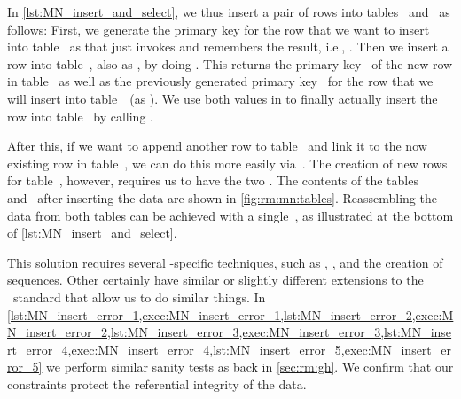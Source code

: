 %
\begin{sloppypar}%
In \cref{lst:MN_insert_and_select}, we thus insert a pair of rows into tables~ and~ as follows:
First, we generate the primary key for the row that we want to insert into table~ as  that just invokes  and remembers the result, i.e., .
Then we insert a row into table~, also as , by doing .
This  returns the primary key~ of the new row in table~ as well as the previously generated primary key~ for the row that we will insert into table~~(as ).
We use both values in to finally actually insert the row into table~ by calling .%
\end{sloppypar}%
%
After this, if we want to append  another row to table~ and link it to the now existing row in table~, we can do this more easily via~.
The creation of new rows for table~, however, requires us to have the two .
The contents of the tables~ and~ after inserting the data are shown in \cref{fig:rm:mn:tables}.
Reassembling the data from both tables can be achieved with a single~, as illustrated at the bottom of \cref{lst:MN_insert_and_select}.

This solution requires several \postgresql-specific techniques, such as , , and the creation of sequences.
Other  certainly have similar or slightly different extensions to the \sql\ standard that allow us to do similar things.
In \cref{lst:MN_insert_error_1,exec:MN_insert_error_1,lst:MN_insert_error_2,exec:MN_insert_error_2,lst:MN_insert_error_3,exec:MN_insert_error_3,lst:MN_insert_error_4,exec:MN_insert_error_4,lst:MN_insert_error_5,exec:MN_insert_error_5} we perform similar sanity tests as back in \cref{sec:rm:gh}.
We confirm that our constraints protect the referential integrity of the data.%
%
\FloatBarrier%
\endhsection%
%
